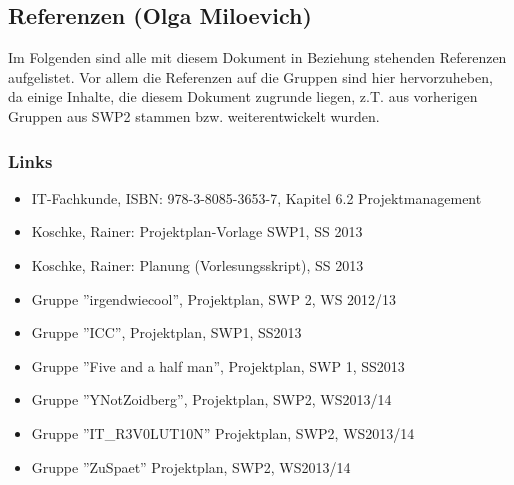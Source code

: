 \documentclass[fontsize=12pt,paper=a4,twoside]{scrartcl}
\begin{document}
\subsection{Referenzen (Olga Miloevich)}\label{referenzen}

Im Folgenden sind alle mit diesem Dokument in Beziehung stehenden Referenzen aufgelistet. Vor allem die Referenzen auf die Gruppen sind hier hervorzuheben, da einige Inhalte, die diesem Dokument zugrunde liegen, z.T. aus vorherigen Gruppen aus SWP2 stammen bzw. weiterentwickelt wurden.

\subsubsection{Links}
\begin{itemize}

  \item IT-Fachkunde, ISBN: 978-3-8085-3653-7, Kapitel 6.2 Projektmanagement
  \item Koschke, Rainer: Projektplan-Vorlage SWP1, SS 2013
  \item Koschke, Rainer: Planung (Vorlesungsskript), SS 2013
  \item Gruppe ''irgendwiecool'', Projektplan, SWP 2, WS 2012/13
  \item Gruppe ''ICC'', Projektplan, SWP1, SS2013
  \item Gruppe ''Five and a half man'', Projektplan, SWP 1, SS2013
  \item Gruppe ''YNotZoidberg'', Projektplan, SWP2, WS2013/14
  \item Gruppe ''IT\_R3V0LUT10N'' Projektplan, SWP2, WS2013/14
  \item Gruppe ''ZuSpaet'' Projektplan, SWP2, WS2013/14


\end{itemize}
\end{document}

